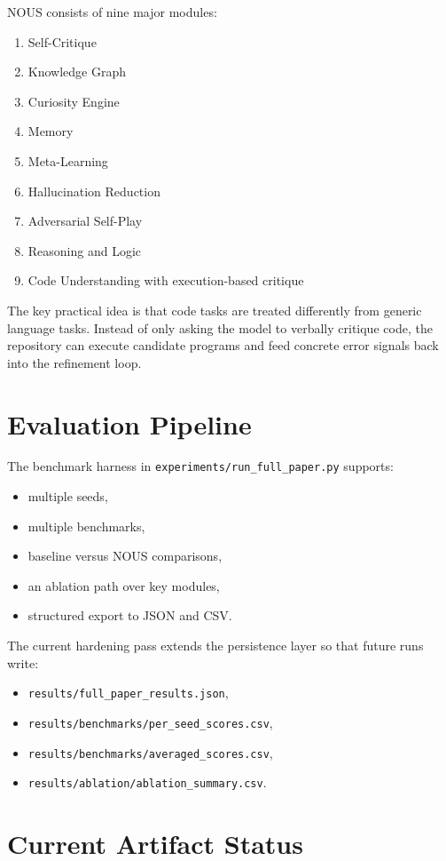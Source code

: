 \documentclass[conference]{IEEEtran}
\begin{document}
NOUS consists of nine major modules:
\begin{enumerate}
  \item Self-Critique
  \item Knowledge Graph
  \item Curiosity Engine
  \item Memory
  \item Meta-Learning
  \item Hallucination Reduction
  \item Adversarial Self-Play
  \item Reasoning and Logic
  \item Code Understanding with execution-based critique
\end{enumerate}

The key practical idea is that code tasks are treated differently from generic
language tasks. Instead of only asking the model to verbally critique code, the
repository can execute candidate programs and feed concrete error signals back
into the refinement loop.

\section{Evaluation Pipeline}

The benchmark harness in \texttt{experiments/run\_full\_paper.py} supports:
\begin{itemize}
  \item multiple seeds,
  \item multiple benchmarks,
  \item baseline versus NOUS comparisons,
  \item an ablation path over key modules,
  \item structured export to JSON and CSV.
\end{itemize}

The current hardening pass extends the persistence layer so that future runs
write:
\begin{itemize}
  \item \texttt{results/full\_paper\_results.json},
  \item \texttt{results/benchmarks/per\_seed\_scores.csv},
  \item \texttt{results/benchmarks/averaged\_scores.csv},
  \item \texttt{results/ablation/ablation\_summary.csv}.
\end{itemize}

\section{Current Artifact Status}
\end{document}
